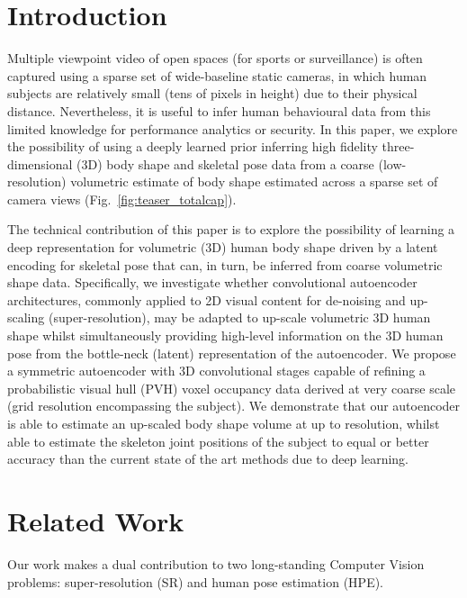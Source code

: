 \documentclass[runningheads]{llncs}
\begin{document}
\section{Introduction}

Multiple viewpoint video of open spaces (\eg for sports or surveillance) is often captured using a sparse set of wide-baseline static cameras, in which human subjects are relatively small (tens of pixels in height) due to their physical distance.  Nevertheless, it is useful to infer human behavioural data from this limited knowledge for performance analytics or security.  In this paper, we explore the possibility of using a deeply learned prior inferring high fidelity three-dimensional (3D) body shape and skeletal pose data from a coarse (low-resolution) volumetric estimate of body shape estimated across a sparse set of camera views (Fig.~\ref{fig:teaser_totalcap}).

The technical contribution of this paper is to explore the possibility of learning a deep representation for volumetric (3D) human body shape driven by a latent encoding for skeletal pose that can, in turn, be inferred from coarse volumetric shape data.  Specifically, we investigate whether convolutional autoencoder architectures, commonly applied to 2D visual content for de-noising and up-scaling (super-resolution),  may be adapted to up-scale volumetric 3D human shape whilst simultaneously providing high-level information on the 3D human pose from the bottle-neck (latent) representation of the autoencoder.   We propose a symmetric autoencoder with 3D convolutional stages capable of refining a probabilistic visual hull (PVH) \cite{Grauman2003} \ie voxel occupancy data derived at very coarse scale (grid resolution  encompassing the subject).  We demonstrate that our autoencoder is able to estimate an up-scaled body shape volume at up to  resolution, whilst able to estimate the skeleton joint positions of the subject to equal or better accuracy than the current state of the art methods due to deep learning.

\section{Related Work}

Our work makes a dual contribution to two long-standing Computer Vision problems: super-resolution (SR) and human pose estimation (HPE).
\end{document}
